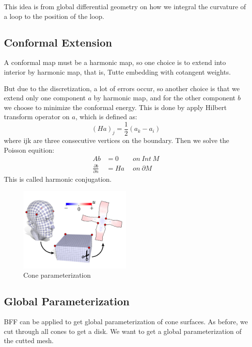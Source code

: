 \documentclass[fleqn,10pt]{wlscirep}
\begin{document}
This idea is from global differential geometry on how we integral the curvature of a loop to the position of the loop.

\subsection{Conformal Extension}
A conformal map must be a harmonic map, so one choice is to extend into interior by harmonic map, that is, Tutte embedding with cotangent weights.

But due to the discretization, a lot of errors occur, so another choice is that we extend only one component $a$ by harmonic map, and for the other component $b$ we choose to minimize the conformal energy. This is done by apply Hilbert transform operator on $a$, which is defined as:
\begin{equation}
(Ha)_j = \frac{1}{2} (a_k - a_i) 
\end{equation}
where ijk are three consecutive vertices on the boundary.
Then we solve the Poisson equition:
\begin{equation}
\begin{split}
Ab &=   0\  &on\  Int\  M\\
\frac{\partial b }{\partial n} &= Ha\ \  &on\ \partial M 
\end{split}
\end{equation}
This is called harmonic conjugation.


\begin{figure}
\centering
\includegraphics[width=0.5\textwidth]{images/cone}
\caption{Cone parameterization}
\label{fig:cone}
\end{figure}


\subsection{Global Parameterization}
BFF can be applied to get global parameterization of cone surfaces. As before, we cut through all cones to get a disk. We want to get a global parameterization of the cutted mesh.
\end{document}
